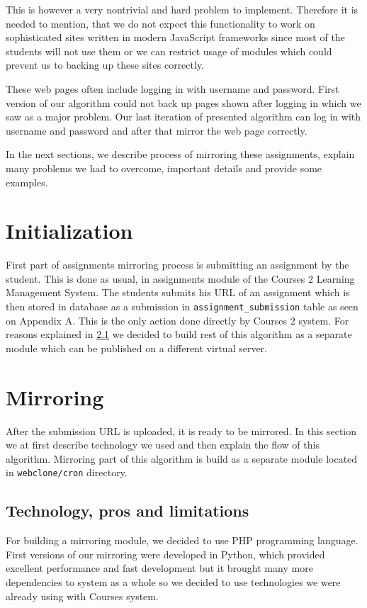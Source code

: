 This is however a very nontrivial and hard problem to implement. Therefore it is needed to mention, that we do not expect this functionality to work on sophisticated sites written in modern JavaScript frameworks since most of the students will not use them or we can restrict usage of modules which could prevent us to backing up these sites correctly.

These web pages often include logging in with username and password. First version of our algorithm could not back up pages shown after logging in which we saw as a major problem. Our last iteration of presented algorithm can log in with username and password and after that mirror the web page correctly.

In the next sections, we describe process of mirroring these assignments, explain many problems we had to overcome, important details and provide some examples.

\section{Initialization}
First part of assignments mirroring process is submitting an assignment by the student. This is done as usual, in assignments module of the Courses 2 Learning Management System. The students submits his URL of an assignment which is then stored in database as a submission in \texttt{assignment\_submission} table as seen on Appendix A. This is the only action done directly by Courses 2 system. For reasons explained in \ref{sec:technology} we decided to build rest of this algorithm as a separate module which can be published on a different virtual server.

\section{Mirroring}
After the submission URL is uploaded, it is ready to be mirrored. In this section we at first describe technology we used and then explain the flow of this algorithm. Mirroring part of this algorithm is build as a separate module located in \texttt{webclone/cron} directory.

\subsection{Technology, pros and limitations}
\label{sec:technology}
For building a mirroring module, we decided to use PHP programming language. First versions of our mirroring were developed in Python, which provided excellent performance and fast development but it brought many more dependencies to system as a whole so we decided to use technologies we were already using with Courses system. 

